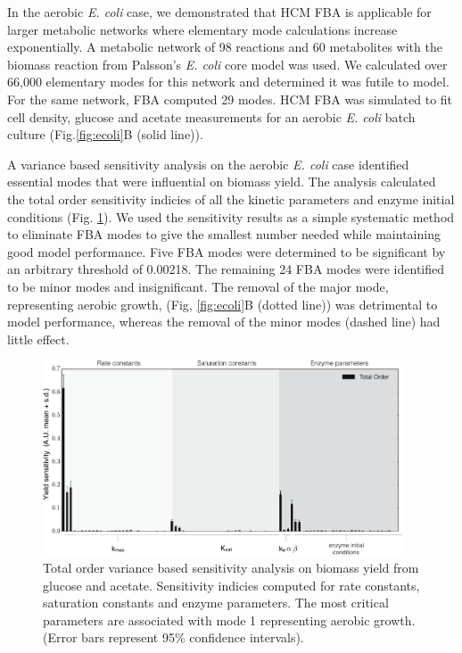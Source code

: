 \documentclass[10pt,twocolumn,twoside,final]{IEEEtran}
\begin{document}
In the aerobic \textit{E. coli} case, we demonstrated that HCM FBA is applicable for larger metabolic networks where elementary mode calculations increase exponentially.
A metabolic network\cite{2007_schuetz_etal_MolSysBio} of 98 reactions and 60 metabolites with the biomass reaction from Palsson's \textit{E. coli} core model\cite{2006_Palsson_model} was used.
We calculated over 66,000 elementary modes for this network and determined it was futile to model. 
For the same network, FBA computed 29 modes. 
HCM FBA was simulated to fit cell density, glucose and acetate measurements for an aerobic \textit{E. coli} batch culture\cite{1994_varma_palsson_ApplEnvMicro} (Fig.\ref{fig:ecoli}B (solid line)). 
 
A variance based sensitivity analysis on the aerobic \textit{E. coli} case identified essential modes that were influential on biomass yield. 
The analysis calculated the total order sensitivity indicies of all the kinetic parameters and enzyme initial conditions (Fig. \ref{fig:sensitivity}).
We used the sensitivity results as a simple systematic method to eliminate FBA modes to give the smallest number needed while maintaining good model performance.   
Five FBA modes were determined to be significant by an arbitrary threshold of 0.00218. 
The remaining 24 FBA modes were identified to be minor modes and insignificant. 
The removal of the major mode, representing aerobic growth, (Fig, \ref{fig:ecoli}B (dotted line)) was detrimental to model performance, whereas the removal of the minor modes (dashed line) had little effect. 


\begin{figure}[!t]\centering
\includegraphics[width=0.95\textwidth]{./figs/Fig-3-Sensitivity-Results.pdf}
\caption{Total order variance based sensitivity analysis on biomass yield from glucose and acetate. Sensitivity indicies computed for rate constants, saturation constants and enzyme parameters. The most critical parameters are associated with mode 1 representing aerobic growth. (Error bars represent 95\% confidence intervals).    
}
\label{fig:sensitivity}
\end{figure} 
\end{document}
